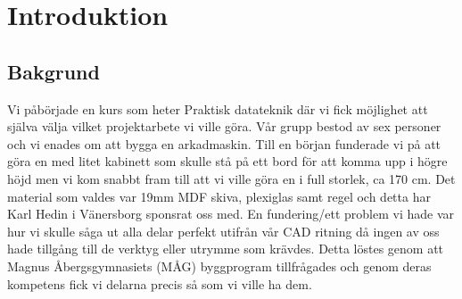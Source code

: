 \documentclass[12pt,fleqn,openany]{book} %
\begin{document}




\pagestyle{empty} %

\tableofcontents %


\pagestyle{fancy} %





\chapter{Introduktion}

\section{Bakgrund}
Vi påbörjade en kurs som heter Praktisk datateknik där vi fick möjlighet att själva välja vilket projektarbete vi ville göra.
Vår grupp bestod av sex personer och vi enades om att bygga en arkadmaskin. Till en början funderade vi på att göra en med litet 
kabinett som skulle stå på ett bord för att komma upp i högre höjd men vi kom snabbt fram till att vi ville göra en i full storlek, 
ca 170 cm. Det material som valdes var 19mm MDF skiva, plexiglas samt regel och detta har Karl Hedin i Vänersborg sponsrat oss med. 
En fundering/ett problem vi hade var hur vi skulle såga ut alla delar perfekt utifrån vår CAD ritning då ingen av oss hade tillgång 
till de verktyg eller utrymme som krävdes. Detta löstes genom att Magnus Åbergsgymnasiets (MÅG) byggprogram tillfrågades och genom deras 
kompetens fick vi delarna precis så som vi ville ha dem. 
\bigskip
\end{document}

